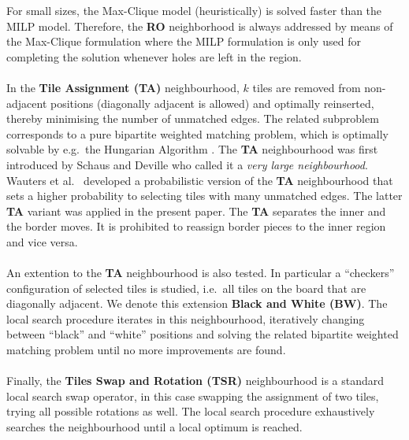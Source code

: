 \documentclass[preprint,12pt]{elsarticle}
\begin{document}
For small sizes, the Max-Clique model (heuristically) is solved faster than the MILP model.  Therefore,  
the \textbf{RO} neighborhood is always addressed by means of the Max-Clique formulation
where the MILP formulation is only used for completing the solution whenever holes are left in the region.
\\
\\
In the \textbf{Tile Assignment (TA)} neighbourhood, $k$ tiles are removed from non-adjacent positions (diagonally adjacent is allowed) and optimally reinserted, thereby minimising the number of unmatched edges.
The related subproblem corresponds to a pure bipartite weighted matching problem, which is optimally solvable by e.g.\ the Hungarian Algorithm \cite{KU55}.
The \textbf{TA} neighbourhood was first introduced by Schaus and Deville \cite{SD08} who called it a \emph{very large neighbourhood}.
Wauters et al.\ \cite{WVV12} developed a probabilistic version of the \textbf{TA} neighbourhood that sets a higher probability to selecting tiles with many unmatched edges.
The latter \textbf{TA} variant was applied in the present paper.
The \textbf{TA} separates the inner and the border moves. It is prohibited to reassign border pieces to the inner region and vice versa.
\\
\\
An extention to the \textbf{TA} neighbourhood is also tested. In particular a ``checkers'' configuration of selected tiles  is studied, i.e.~all tiles on the board that are diagonally adjacent. We denote this extension \textbf{Black and White (BW)}.
The local search procedure iterates in this neighbourhood, iteratively changing between ``black'' and ``white'' positions and solving the related bipartite weighted matching problem until no more improvements are found.
\\
\\
Finally, the \textbf{Tiles Swap and Rotation (TSR)} neighbourhood is a standard local search swap operator, in this case swapping the assignment of two tiles, trying all possible rotations as well.
The local search procedure exhaustively searches the neighbourhood until a local optimum is reached.
\end{document}

